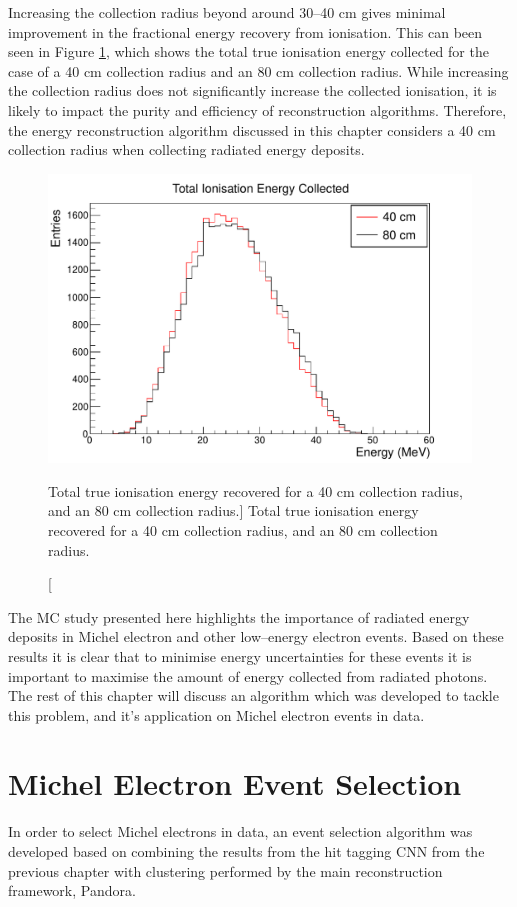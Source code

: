 Increasing the collection radius beyond around 30--40 cm gives minimal
improvement in the fractional energy recovery from ionisation. This can been
seen in Figure \ref{fig:40_v_80}, which shows the total true ionisation energy
collected for the case of a 40 cm collection radius and an 80 cm collection
radius. While increasing the collection radius does not significantly increase
the collected ionisation, it is likely to impact the purity and efficiency of 
reconstruction algorithms. Therefore, the energy reconstruction algorithm 
discussed in this chapter considers a 40 cm collection radius when collecting 
radiated energy deposits.
\begin{figure}
	\centering
	\includegraphics[width=\textwidth]{figures/40_v_80.pdf}
	\caption
	[Total true ionisation energy recovered for a 40 cm collection radius, and an
	80 cm collection radius.]
	{ Total true ionisation energy recovered for a 40 cm collection radius, and an
	80 cm collection radius. }
	\label{fig:40_v_80}
\end{figure}

The MC study presented here highlights the importance of radiated energy
deposits in Michel electron and other low--energy electron events. Based on
these results it is clear that to minimise energy uncertainties for these events
it is important to maximise the amount of energy collected from radiated 
photons. The rest of this chapter will discuss an algorithm which was developed 
to tackle this problem, and it's application on Michel electron events in 
\protodune{} data.

\section{Michel Electron Event Selection} \label{ME_ES}
In order to select Michel electrons in \protodune{} data, an event selection
algorithm was developed based on combining the results from the hit tagging CNN 
from the previous chapter with clustering performed by the main \protodune{} 
reconstruction framework, Pandora. 

